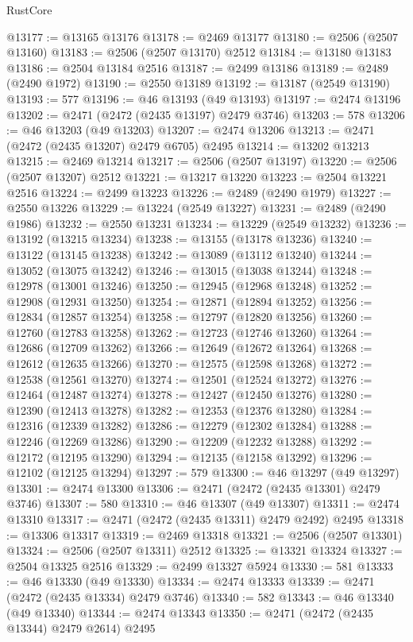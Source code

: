 \begin{lexlean}{RustCore}
\begin{coremodule}
@13177 := @13165 @13176
@13178 := @2469 @13177
@13180 := @2506 (@2507 @13160)
@13183 := @2506 (@2507 @13170) @2512
@13184 := @13180 @13183
@13186 := @2504 @13184 @2516
@13187 := @2499 @13186
@13189 := @2489 (@2490 @1972)
@13190 := @2550 @13189
@13192 := @13187 (@2549 @13190)
@13193 := 577
@13196 := @46 @13193 (@49 @13193)
@13197 := @2474 @13196
@13202 := @2471 (@2472 (@2435 @13197) @2479 @3746)
@13203 := 578
@13206 := @46 @13203 (@49 @13203)
@13207 := @2474 @13206
@13213 := @2471 (@2472 (@2435 @13207) @2479 @6705) @2495
@13214 := @13202 @13213
@13215 := @2469 @13214
@13217 := @2506 (@2507 @13197)
@13220 := @2506 (@2507 @13207) @2512
@13221 := @13217 @13220
@13223 := @2504 @13221 @2516
@13224 := @2499 @13223
@13226 := @2489 (@2490 @1979)
@13227 := @2550 @13226
@13229 := @13224 (@2549 @13227)
@13231 := @2489 (@2490 @1986)
@13232 := @2550 @13231
@13234 := @13229 (@2549 @13232)
@13236 := @13192 (@13215 @13234)
@13238 := @13155 (@13178 @13236)
@13240 := @13122 (@13145 @13238)
@13242 := @13089 (@13112 @13240)
@13244 := @13052 (@13075 @13242)
@13246 := @13015 (@13038 @13244)
@13248 := @12978 (@13001 @13246)
@13250 := @12945 (@12968 @13248)
@13252 := @12908 (@12931 @13250)
@13254 := @12871 (@12894 @13252)
@13256 := @12834 (@12857 @13254)
@13258 := @12797 (@12820 @13256)
@13260 := @12760 (@12783 @13258)
@13262 := @12723 (@12746 @13260)
@13264 := @12686 (@12709 @13262)
@13266 := @12649 (@12672 @13264)
@13268 := @12612 (@12635 @13266)
@13270 := @12575 (@12598 @13268)
@13272 := @12538 (@12561 @13270)
@13274 := @12501 (@12524 @13272)
@13276 := @12464 (@12487 @13274)
@13278 := @12427 (@12450 @13276)
@13280 := @12390 (@12413 @13278)
@13282 := @12353 (@12376 @13280)
@13284 := @12316 (@12339 @13282)
@13286 := @12279 (@12302 @13284)
@13288 := @12246 (@12269 @13286)
@13290 := @12209 (@12232 @13288)
@13292 := @12172 (@12195 @13290)
@13294 := @12135 (@12158 @13292)
@13296 := @12102 (@12125 @13294)
@13297 := 579
@13300 := @46 @13297 (@49 @13297)
@13301 := @2474 @13300
@13306 := @2471 (@2472 (@2435 @13301) @2479 @3746)
@13307 := 580
@13310 := @46 @13307 (@49 @13307)
@13311 := @2474 @13310
@13317 := @2471 (@2472 (@2435 @13311) @2479 @2492) @2495
@13318 := @13306 @13317
@13319 := @2469 @13318
@13321 := @2506 (@2507 @13301)
@13324 := @2506 (@2507 @13311) @2512
@13325 := @13321 @13324
@13327 := @2504 @13325 @2516
@13329 := @2499 @13327 @5924
@13330 := 581
@13333 := @46 @13330 (@49 @13330)
@13334 := @2474 @13333
@13339 := @2471 (@2472 (@2435 @13334) @2479 @3746)
@13340 := 582
@13343 := @46 @13340 (@49 @13340)
@13344 := @2474 @13343
@13350 := @2471 (@2472 (@2435 @13344) @2479 @2614) @2495

\end{coremodule}
\end{lexlean}
